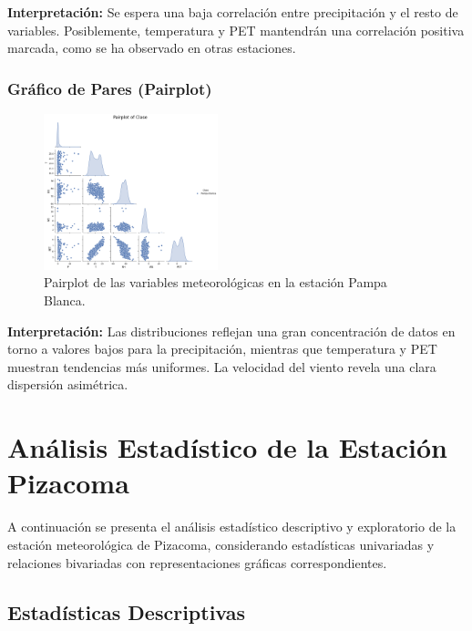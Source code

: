\textbf{Interpretación:} Se espera una baja correlación entre precipitación y el resto de variables. Posiblemente, temperatura y PET mantendrán una correlación positiva marcada, como se ha observado en otras estaciones.

\subsubsection*{Gráfico de Pares (Pairplot)}
\begin{figure}[H]
\centering
\includegraphics[width=0.45\textwidth]{resultados/por_estacion_meteorologica/Pampa_Blanca/pairplot.png}
\caption{Pairplot de las variables meteorológicas en la estación Pampa Blanca.}
\label{fig:pampablanca_pairplot}
\end{figure}
\textbf{Interpretación:} Las distribuciones reflejan una gran concentración de datos en torno a valores bajos para la precipitación, mientras que temperatura y PET muestran tendencias más uniformes. La velocidad del viento revela una clara dispersión asimétrica.



\section{Análisis Estadístico de la Estación Pizacoma}

A continuación se presenta el análisis estadístico descriptivo y exploratorio de la estación meteorológica de Pizacoma, considerando estadísticas univariadas y relaciones bivariadas con representaciones gráficas correspondientes.

\subsection{Estadísticas Descriptivas}

